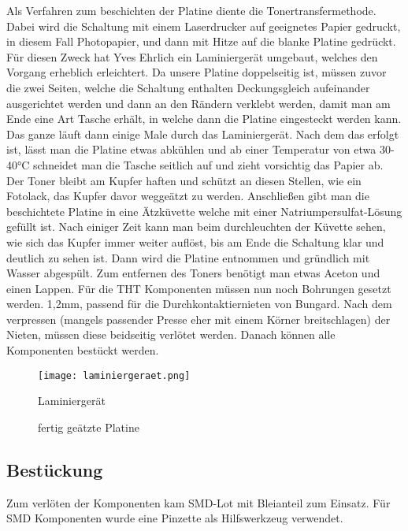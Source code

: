 \documentclass{article}
\begin{document}
Als Verfahren zum beschichten der Platine diente die Tonertransfermethode. Dabei wird die Schaltung mit einem Laserdrucker auf geeignetes Papier gedruckt, in diesem Fall Photopapier, und dann mit Hitze auf die blanke Platine gedrückt. Für diesen Zweck hat Yves Ehrlich ein Laminiergerät umgebaut, welches den Vorgang erheblich erleichtert.
Da unsere Platine doppelseitig ist, müssen zuvor die zwei Seiten, welche die Schaltung enthalten Deckungsgleich aufeinander ausgerichtet werden und dann an den Rändern verklebt werden, damit man am Ende eine Art Tasche erhält, in welche dann die Platine eingesteckt werden kann.
Das ganze läuft dann einige Male durch das Laminiergerät. Nach dem das erfolgt ist, lässt man die Platine etwas abkühlen und ab einer Temperatur von etwa 30-40°C schneidet man die Tasche seitlich auf und zieht vorsichtig das Papier ab. Der Toner bleibt am Kupfer haften und schützt an diesen Stellen, wie ein Fotolack, das Kupfer davor weggeätzt zu werden.
Anschließen gibt man die beschichtete Platine in eine Ätzküvette welche mit einer Natriumpersulfat-Lösung gefüllt ist. Nach einiger Zeit kann man beim durchleuchten der Küvette sehen, wie sich das Kupfer immer weiter auflöst, bis am Ende die Schaltung klar und deutlich zu sehen ist. Dann wird die Platine entnommen und gründlich mit Wasser abgespült.
Zum entfernen des Toners benötigt man etwas Aceton und einen Lappen.
Für die THT Komponenten müssen nun noch Bohrungen gesetzt werden. 1,2mm, passend für die Durchkontaktiernieten von Bungard.
Nach dem verpressen (mangels passender Presse eher mit einem Körner breitschlagen) der Nieten, müssen diese beidseitig verlötet werden. Danach können alle Komponenten bestückt werden.

\begin{figure}[h]
	\texttt{[image: laminiergeraet.png]}
	\centering
	\caption{Laminiergerät}
\end{figure}

\begin{figure}[h]
	\centering 
\caption{fertig geätzte Platine} 
\end{figure} 

\newpage
\subsection{Bestückung}%

Zum verlöten der Komponenten kam SMD-Lot mit Bleianteil zum Einsatz.
Für SMD Komponenten wurde eine Pinzette als Hilfswerkzeug verwendet.
\end{document}
